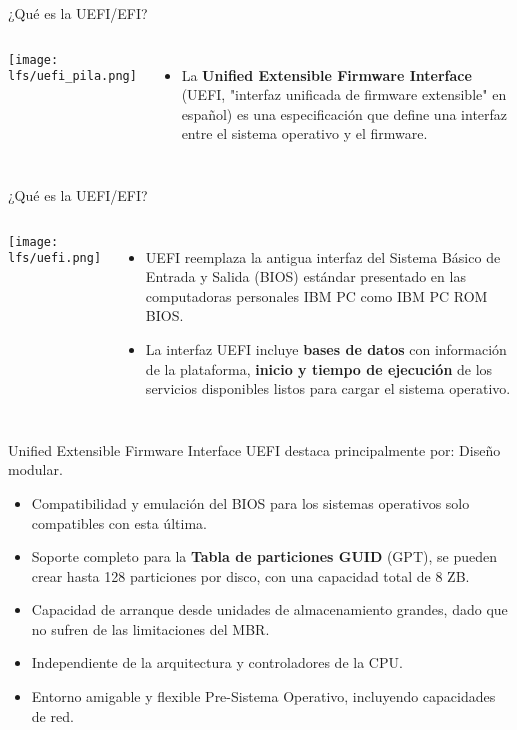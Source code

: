 \begin{frame}[c]{¿Qué es la UEFI/EFI?}
  \begin{columns}
      \begin{center}
        \texttt{[image: lfs/uefi\_pila.png]}
      \end{center}
    \begin{itemize}
      \item La \textbf{Unified Extensible Firmware Interface} (UEFI, "interfaz
        unificada de firmware extensible" en español) es una especificación
        que define una interfaz entre el sistema operativo y el firmware.
    \end{itemize}
  \end{columns}
\end{frame}

\begin{frame}[c]{¿Qué es la UEFI/EFI?}
  \begin{columns}
      \begin{center}
        \texttt{[image: lfs/uefi.png]}
      \end{center}
    \begin{itemize}
      \item UEFI reemplaza la antigua interfaz del Sistema Básico de Entrada
        y Salida (BIOS) estándar presentado en las computadoras personales
        IBM PC como IBM PC ROM BIOS.
      \pausa
      \item La interfaz UEFI incluye \textbf{bases de datos} con información
        de la plataforma, \textbf{inicio y tiempo de ejecución} de los
        servicios disponibles listos para cargar el sistema operativo.
    \end{itemize}
  \end{columns}
\end{frame}

\begin{frame}[c]{Unified Extensible Firmware Interface}
  UEFI destaca principalmente por:
    Diseño modular.
  \begin{itemize}
    \item Compatibilidad y emulación del BIOS para los sistemas operativos
      solo compatibles con esta última.
    \pausa
    \item Soporte completo para la \textbf{Tabla de particiones GUID} (GPT),
      se pueden crear hasta 128 particiones por disco, con una capacidad
      total de 8 ZB.
    \pausa
    \item Capacidad de arranque desde unidades de almacenamiento grandes,
      dado que no sufren de las limitaciones del MBR.
    \pausa
    \item Independiente de la arquitectura y controladores de la CPU.
    \pausa
    \item Entorno amigable y flexible Pre-Sistema Operativo, incluyendo
      capacidades de red.
  \end{itemize}
\end{frame}

